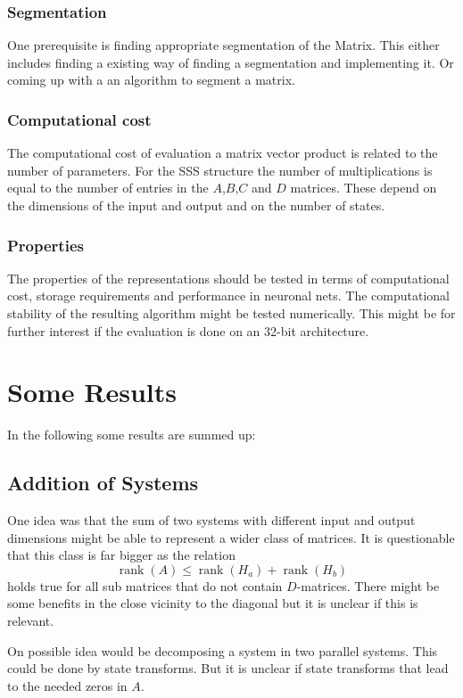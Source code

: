 \documentclass[lang=ngerman,inputenc=utf8,fontsize=10pt]{ldvarticle}
\DeclareMathOperator{\rank}{rank}
\begin{document}
\subsubsection*{Segmentation}
One prerequisite is finding appropriate segmentation of the Matrix. This either includes finding a existing way of finding a segmentation and implementing it.
Or coming up with a an algorithm to segment a matrix.

\subsubsection*{Computational cost}
The computational cost of evaluation a matrix vector product is related to the number of parameters.
For the SSS structure the number of multiplications is equal to the number of entries in the $A$,$B$,$C$ and $D$ matrices. These depend on the dimensions of the input and output and on the number of states.

\subsubsection*{Properties}
The properties of the representations should be tested in terms of computational cost, storage requirements and performance in neuronal nets.
The computational stability of the resulting algorithm might be tested numerically. This might be for further interest if the evaluation is done on an 32-bit architecture.

\section*{Some Results}
In the following some results are summed up:

\subsection*{Addition of Systems}
One idea was that the sum of two systems with different input and output dimensions might be able to represent a wider class of matrices.
It is questionable that this class is far bigger as the relation 
\begin{equation}
	\rank(A) \leq \rank(H_a) + \rank(H_b) 
\end{equation}
holds true for all sub matrices that do not contain $D$-matrices.
There might be some benefits in the close vicinity to the diagonal but it is unclear if this is relevant.

On possible idea would be decomposing a system in two parallel systems.
This could be done by state transforms. But it is unclear if state transforms that lead to the needed zeros in $A$.
\end{document}

